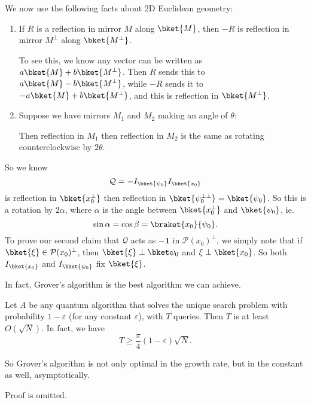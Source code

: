 \documentclass[a4paper]{article}
\begin{document}
We now use the following facts about 2D Euclidean geometry:
\begin{enumerate}
  \item If $R$ is a reflection in mirror $M$ along $\bket{M}$, then $-R$ is reflection in mirror $M^\perp$ along $\bket{M^\perp}$.

    To see this, we know any vector can be written as $a\bket{M} + b \bket{M^\perp}$. Then $R$ sends this to $a \bket{M} - b\bket{M^\perp}$, while $-R$ sends it to $-a \bket{M} + b \bket{M^\perp}$, and this is reflection in $\bket{M^\perp}$.

  \item Suppose we have mirrors $M_1$ and $M_2$ making an angle of $\theta$:
    \begin{center}
    \end{center}
    Then reflection in $M_1$ then reflection in $M_2$ is the same as rotating counterclockwise by $2\theta$.
\end{enumerate}
So we know
\[
  \mathcal{Q} = -I_{\bket{\psi_0}} I_{\bket{x_0}}
\]
is reflection in $\bket{x_0^\perp}$ then reflection in $\bket{\psi_0^{\perp\perp}} = \bket{\psi_0}$. So this is a rotation by $2\alpha$, where $\alpha$ is the angle between $\bket{x_0^\perp}$ and $\bket{\psi_0}$, ie.
\[
  \sin \alpha = \cos \beta = \braket{x_0}{\psi_0}.
\]
To prove our second claim that $\mathcal{Q}$ acts as $-\mathbf{1}$ in $\mathcal{P}(x_0)^\perp$, we simply note that if $\bket{\xi} \in \mathcal{P}(x_0)^\perp$, then $\bket{\xi} \perp \bket\psi_0$ and $\xi \perp\bket{x_0}$. So both $I_{\bket{x_0}}$ and $I_{\bket{\psi_0}}$ fix $\bket{\xi}$.

In fact, Grover's algorithm is the best algorithm we can achieve.
\begin{thm}
  Let $A$ be any quantum algorithm that solves the unique search problem with probability $1 - \varepsilon$ (for any constant $\varepsilon$), with $T$ queries. Then $T$ is at least $O(\sqrt{N})$. In fact, we have
  \[
    T \geq \frac{\pi}{4}(1 - \varepsilon) \sqrt{N}.
  \]
\end{thm}
So Grover's algorithm is not only optimal in the growth rate, but in the constant as well, asymptotically.

Proof is omitted.
\end{document}
